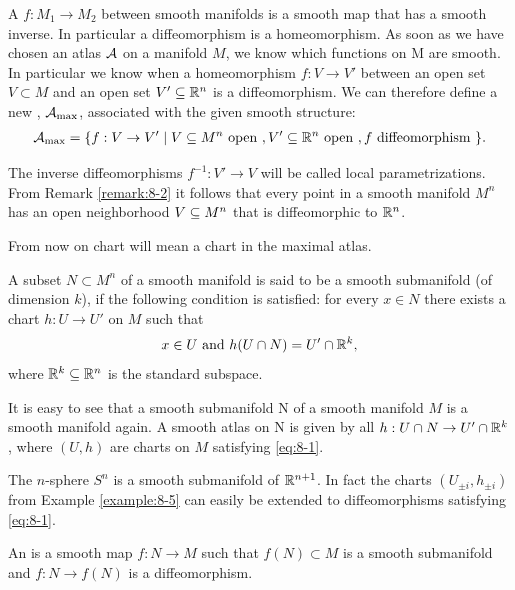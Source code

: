A  $f: M_1\to M_2$ between smooth manifolds is a smooth map that
has a smooth inverse. In particular a diffeomorphism is a homeomorphism.
As soon as we have chosen an atlas $\mathcal{A}$ on a manifold $M$, we know which functions
on M are smooth. In particular we know when a homeomorphism $f:V\to V'$
between an open set $V\subset M$ and an open set $V'\subseteq {\ensuremath{\mathbb{R}}}^n$ is a diffeomorphism.
We can therefore define a new , $\mathcal{A}_{\max}$, associated with the given
smooth structure:
\begin{align*}
  \mathcal{A}_{\max} = \{
      f:V \to V'\mid 
        V \subseteq M^n \text{ open }, 
        V'\subseteq{\ensuremath{\mathbb{R}}}^n \text{ open }, 
        f \text{ diffeomorphism }
    \}.
\end{align*}

The inverse diffeomorphisms $f^{-1}: V'\to V$ will be called local parametrizations.
From Remark \ref{remark:8-2} it follows that every point in a smooth manifold $M^n$ has an
open neighborhood $V\subseteq M^n$ that is diffeomorphic to ${\mathbb{R}}^n$.

From now on chart will mean a chart in the maximal atlas.

\begin{definition}\label{definition:8-8}
  A subset $N\subset M^n$ of a smooth manifold is said to be a smooth
  submanifold (of dimension $k$), if the following condition is satisfied: for every
  $x\in N$ there exists a chart $h:U\to U'$ on $M$ such that
  \begin{align}\label{eq:8-1}
    x\in U \text{ and } h(U\cap N) = U'\cap {\ensuremath{\mathbb{R}}}^k,
  \end{align}
  where ${\mathbb{R}}^k\subseteq{\ensuremath{\mathbb{R}}}^n$ is the standard subspace.
\end{definition}

It is easy to see that a smooth submanifold N of a smooth manifold $M$ is a smooth
manifold again. A smooth atlas on N is given by all $h:U\cap N\to U'\cap{\ensuremath{\mathbb{R}}}^k$, where
$(U, h)$ are charts on $M$ satisfying \eqref{eq:8-1}.

\begin{example}\label{example:8-9}
  The $n$-sphere $S^n$ is a smooth submanifold of ${\mathbb{R}}^{n+1}$. In fact the
  charts $(U_{\pm i}, h_{\pm i})$ from Example \ref{example:8-5} can easily be extended to 
  diffeomorphisms satisfying \eqref{eq:8-1}.
\end{example}

\begin{definition}\label{definition:8-10}
  An  is a smooth map $f:N\to M$ such that $f(N)\subset M$
  is a smooth submanifold and $f: N\to f (N)$ is a diffeomorphism.
\end{definition}


